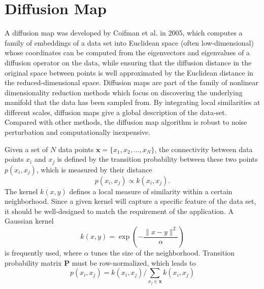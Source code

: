 \section{Diffusion Map\label{Sec:DR:DM}}
A diffusion map was developed by Coifman et al. in 2005\cite{CoifmanPNAS2005a,CoifmanPNAS2005b,CoifmanACHA2006}, which computes a family of embeddings of a data set into Euclidean space (often low-dimensional) whose coordinates can be computed from the eigenvectors and eigenvalues of a diffusion operator on the data, while ensuring that the diffusion distance in the original space between points is well approximated by the Euclidean distance in the reduced-dimensional space. Diffusion maps are part of the family of nonlinear dimensionality reduction methods which focus on discovering the underlying manifold that the data has been sampled from. By integrating local similarities at different scales, diffusion maps give a global description of the data-set. Compared with other methods, the diffusion map algorithm is robust to noise perturbation and computationally inexpensive.

Given a set of $N$ data points $\mathbf{x}=\{x_1, x_2,\dots,x_N\}$, the connectivity between data points $x_i$ and $x_j$ is defined by the transition probability between these two points $p(x_i,x_j)$, which is measured by their distance
\begin{equation}
	p(x_i,x_j)\propto k(x_i,x_j).
\end{equation}
The kernel $k(x,y)$ defines a local measure of similarity within a certain neighborhood. Since a given kernel will capture a specific feature of the data set, it should be well-designed to match the requirement of the application. A Gaussian kernel
\begin{equation}
	k(x,y)=\exp{\left(-\frac{\lVert x-y\rVert^2}{\alpha}\right)}
\end{equation}
is frequently used, where $\alpha$ tunes the size of the neighborhood. Transition probability matrix $\mathbf{P}$ must be row-normalized, which leads to
\begin{equation}
	p(x_i,x_j)= k(x_i,x_j)/\sum\limits_{x_j\in \mathbf{x}}k(x_i,x_j)
\end{equation}
 
